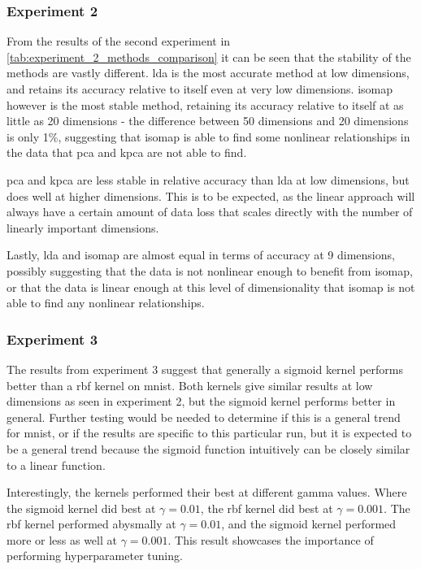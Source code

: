 \subsubsection{Experiment 2}\label{subsec:experiment-2}
From the results of the second experiment in \autoref{tab:experiment_2_methods_comparison} it can be seen that the stability of the methods are vastly different. \gls{lda} is the most accurate method at low dimensions, and retains its accuracy relative to itself even at very low dimensions. \gls{isomap} however is the most stable method, retaining its accuracy relative to itself at as little as 20 dimensions - the difference between 50 dimensions and 20 dimensions is only 1\%, suggesting that \gls{isomap} is able to find some nonlinear relationships in the data that \gls{pca} and \gls{kpca} are not able to find.

\gls{pca} and \gls{kpca} are less stable in relative accuracy than \gls{lda} at low dimensions, but does well at higher dimensions. This is to be expected, as the linear approach will always have a certain amount of data loss that scales directly with the number of linearly important dimensions.

Lastly, \gls{lda} and \gls{isomap} are almost equal in terms of accuracy at 9 dimensions, possibly suggesting that the data is not nonlinear enough to benefit from \gls{isomap}, or that the data is linear enough at this level of dimensionality that \gls{isomap} is not able to find any nonlinear relationships.



\subsubsection{Experiment 3}\label{subsec:experiment-3}
The results from experiment 3 suggest that generally a sigmoid kernel performs better than a \gls{rbf} kernel on \gls{mnist}. Both kernels give similar results at low dimensions as seen in experiment 2, but the sigmoid kernel performs better in general. Further testing would be needed to determine if this is a general trend for \gls{mnist}, or if the results are specific to this particular run, but it is expected to be a general trend because the sigmoid function intuitively can be closely similar to a linear function.

Interestingly, the kernels performed their best at different gamma values. Where the sigmoid kernel did best at $\gamma = 0.01$, the \gls{rbf} kernel did best at $\gamma = 0.001$. The \gls{rbf} kernel performed abysmally at $\gamma = 0.01$, and the sigmoid kernel performed more or less as well at $\gamma = 0.001$. This result showcases the importance of performing hyperparameter tuning.

